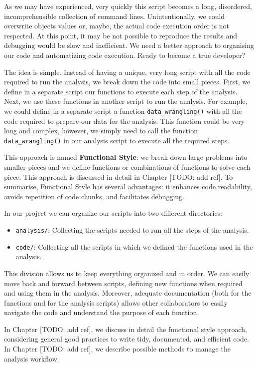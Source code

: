 \documentclass[
  11pt,
]{book}
\providecommand{\tightlist}{%
  \setlength{\itemsep}{0pt}\setlength{\parskip}{0pt}}
\begin{document}
As we may have experienced, very quickly this script becomes a long, disordered, incomprehensible collection of command lines. Unintentionally, we could overwrite objects values or, maybe, the actual code execution order is not respected. At this point, it may be not possible to reproduce the results and debugging would be slow and inefficient. We need a better approach to organising our code and automatizing code execution. Ready to become a true developer?

The idea is simple. Instead of having a unique, very long script with all the code required to run the analysis, we break down the code into small pieces. First, we define in a separate script our functions to execute each step of the analysis. Next, we use these functions in another script to run the analysis. For example, we could define in a separate script a function \texttt{data\_wrangling()} with all the code required to prepare our data for the analysis. This function could be very long and complex, however, we simply need to call the function \texttt{data\_wrangling()} in our analysis script to execute all the required steps.

This approach is named \textbf{Functional Style}: we break down large problems into smaller pieces and we define functions or combinations of functions to solve each piece. This approach is discussed in detail in Chapter {[}TODO: add ref{]}. To summarise, Functional Style has several advantages: it enhances code readability, avoids repetition of code chunks, and facilitates debugging.

In our project we can organize our scripts into two different directories:

\begin{itemize}
\tightlist
\item
  \texttt{analysis/}: Collecting the scripts needed to run all the steps of the analysis.
\item
  \texttt{code/}: Collecting all the scripts in which we defined the functions used in the analysis.
\end{itemize}

This division allows us to keep everything organized and in order. We can easily move back and forward between scripts, defining new functions when required and using them in the analysis. Moreover, adequate documentation (both for the functions and for the analysis scripts) allows other collaborators to easily navigate the code and understand the purpose of each function.

In Chapter {[}TODO: add ref{]}, we discuss in detail the functional style approach, considering general good practices to write tidy, documented, and efficient code. In Chapter {[}TODO: add ref{]}, we describe possible methods to manage the analysis workflow.
\end{document}
